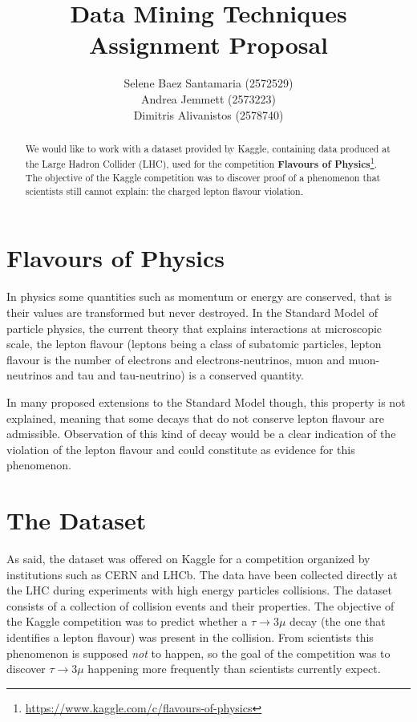\documentclass[11pt]{article}
\title{
	{\textbf{Data Mining Techniques} \\ Assignment Proposal}
}
\author{
\footnotesize{Selene Baez Santamaria (2572529)} \\
\footnotesize{Andrea Jemmett (2573223)} \\
\footnotesize{Dimitris Alivanistos (2578740)}
}
\begin{document}
\maketitle

\begin{abstract}
We would like to work with a dataset provided by Kaggle, containing data
produced at the Large Hadron Collider (LHC), used for the competition
\textbf{Flavours of Physics}\footnote{\url{https://www.kaggle.com/c/flavours-of-physics}}.
The objective of the Kaggle competition was to discover proof of a phenomenon
that scientists still cannot explain: the charged lepton flavour violation.
\end{abstract}

\section{Flavours of Physics}
In physics some quantities such as momentum or energy are conserved, that is
their values are transformed but never destroyed. In the Standard Model of
particle physics, the current theory that explains interactions at microscopic
scale, the lepton flavour (leptons being a class of subatomic particles, lepton
flavour is the number of electrons and electrons-neutrinos, muon and
muon-neutrinos and tau and tau-neutrino) is a conserved quantity.

In many proposed extensions to the Standard Model though, this property is not
explained, meaning that some decays that do not conserve lepton flavour are
admissible. Observation of this kind of decay would be a clear indication of the
violation of the lepton flavour and could constitute as evidence for this
phenomenon.

\section{The Dataset}
As said, the dataset was offered on Kaggle for a competition organized by
institutions such as CERN and LHCb. The data have been collected directly at the
LHC during experiments with high energy particles collisions. The dataset
consists of a collection of collision events and their properties. The objective
of the Kaggle competition was to predict whether a $\tau \rightarrow 3\mu$ decay
(the one that identifies a lepton flavour) was present in the collision. From
scientists this phenomenon is supposed \emph{not} to happen, so the goal of the
competition was to discover $\tau \rightarrow 3\mu$ happening more frequently
than scientists currently expect.
\end{document}
